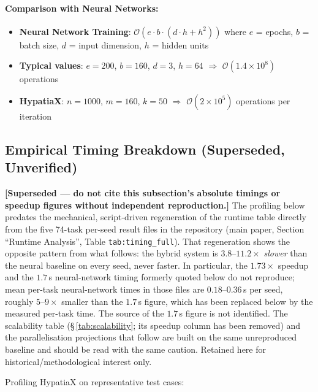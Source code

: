 \documentclass[twoside,11pt]{article}
\begin{document}
\paragraph{Comparison with Neural Networks:}
\begin{itemize}
\item \textbf{Neural Network Training}: $\mathcal{O}(e \cdot b \cdot (d \cdot h + h^2))$ where $e$ = epochs, $b$ = batch size, $d$ = input dimension, $h$ = hidden units
\item \textbf{Typical values}: $e=200$, $b=160$, $d=3$, $h=64$ $\Rightarrow$ $\mathcal{O}(1.4 \times 10^8)$ operations
\item \textbf{HypatiaX}: $n=1000$, $m=160$, $k=50$ $\Rightarrow$ $\mathcal{O}(2 \times 10^5)$ operations per iteration
\end{itemize}

\subsection{Empirical Timing Breakdown (Superseded, Unverified)}

\textbf{[Superseded --- do not cite this subsection's absolute timings or
speedup figures without independent reproduction.]} The profiling below
predates the mechanical, script-driven regeneration of the runtime table
directly from the five 74-task per-seed result files in the repository
(main paper, Section ``Runtime Analysis'', Table \texttt{tab:timing\_full}). That regeneration
shows the opposite pattern from what follows: the hybrid system is
$3.8$--$11.2\times$ \emph{slower} than the neural baseline on every seed,
never faster. In particular, the $1.73\times$ speedup
and the $1.7$\,s neural-network timing formerly quoted below do not reproduce;
mean per-task neural-network times in those files are $0.18$--$0.36$\,s per seed,
roughly $5$--$9\times$ smaller than the $1.7$\,s figure,
which has been replaced below by the measured per-task time. The source of the $1.7$\,s figure is not identified. The scalability table (\S\,\ref{tab:scalability}; its speedup column has been removed)
and the parallelisation projections that follow are built on the same
unreproduced baseline and should be read with the same caution. Retained
here for historical/methodological interest only.

Profiling HypatiaX on representative test cases:
\end{document}

